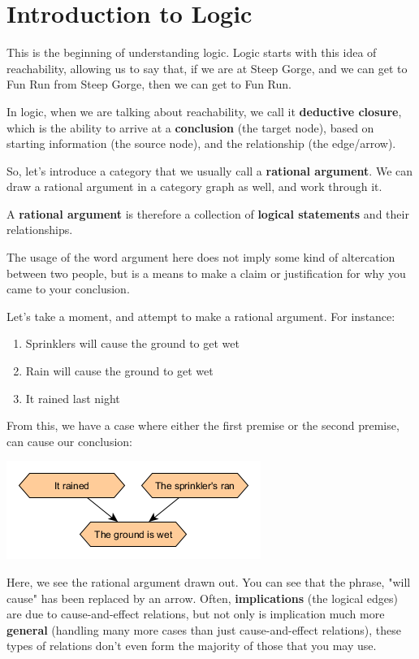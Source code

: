 \chapter{Introduction to Logic}

This is the beginning of understanding logic. Logic starts with this idea of reachability, allowing us to say that, if we are at Steep Gorge, and we can get to Fun Run from Steep Gorge, then we can get to Fun Run.

In logic, when we are talking about reachability, we call it \textbf{deductive closure}, which is the ability to arrive at a \textbf{conclusion} (the target node), based on starting information (the source node), and the relationship (the edge/arrow).

So, let's introduce a category that we usually call a \textbf{rational argument}. We can draw a rational argument in a category graph as well, and work through it.

A \textbf{rational argument} is therefore a collection of \textbf{logical statements} and their relationships.

The usage of the word argument here does not imply some kind of altercation between two people, but is a means to make a claim or justification for why you came to your conclusion.

Let's take a moment, and attempt to make a rational argument. For instance:
\begin{enumerate}
    \item Sprinklers will cause the ground to get wet
    \item Rain will cause the ground to get wet
    \item It rained last night
\end{enumerate}

From this, we have a case where either the first premise or the second premise, can cause our conclusion:

\includegraphics{01/OrCase1.png}

Here, we see the rational argument drawn out. You can see that the phrase, "will cause" has been replaced by an arrow. Often, \textbf{implications} (the logical edges) are due to cause-and-effect relations, but not only is implication much more \textbf{general} (handling many more cases than just cause-and-effect relations), these types of relations don't even form the majority of those that you may use.

